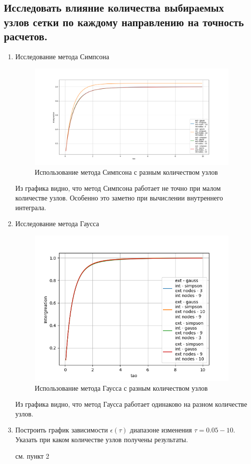 \documentclass[a4paper,12pt]{article}
\begin{document}
\subsection{Исследовать влияние количества выбираемых узлов сетки по  каждому направлению на точность расчетов.}
\begin{enumerate}
    \item Исследование метода Симпсона
    \begin{figure}[H]
        \centering
        \includegraphics[scale=0.42]{./screens/1.png}
        \caption{Использование метода Симпсона с разным количеством узлов}
        \label{fig:my_label}
    \end{figure}

Из графика видно, что метод Симпсона работает не точно при малом количестве узлов. Особенно это заметно при вычислении внутреннего интеграла.

    \item Исследование метода Гаусса
    \begin{figure}[H]
        \centering
        \includegraphics[scale=0.8]{./screens/2.png}
        \caption{Использование метода Гаусса с разным количеством узлов}
        \label{fig:my_label1}
    \end{figure}

Из графика видно, что метод Гаусса работает одинаково на разном количестве узлов.

    \item Построить график зависимости $\epsilon(\tau)$ диапазоне изменения $\tau = 0.05-10$. Указать при каком количестве узлов получены результаты.

см. пункт 2
\end{enumerate}
\end{document}
